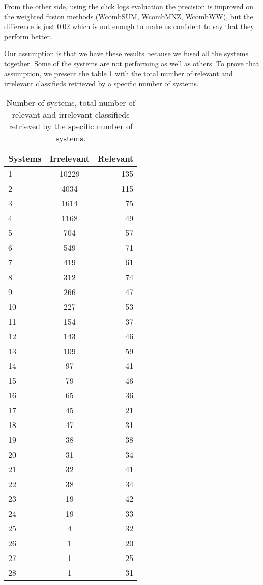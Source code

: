 From the other side, using the click logs evaluation the precision is improved on the weighted fusion methods (WcombSUM, WcombMNZ, WcombWW), but the difference is just 0.02 which is not enough to make us confident to say that they perform better.

Our assumption is that we have these results because we fused all the systems together. Some of the systems are not performing as well as others. To prove that assumption, we present the table \ref{table:relIrelLDF} with the total number of relevant and irrelevant classifieds retrieved by a specific number of systems.


\begin{table}[H]
\begin{center}
\caption{Number of systems, total number of relevant and irrelevant classifieds retrieved by the specific number of systems.}
\label{table:relIrelLDF}
\begin{tabular}{lcr}
\midrule
 Systems & Irrelevant & Relevant \\
 \midrule
1 & 10229 & 135 \\
2 & 4034 & 115 \\
3 & 1614 & 75 \\
4 & 1168 & 49 \\
5 & 704 & 57 \\
6 & 549 & 71 \\
7 & 419 & 61 \\
8 & 312 & 74 \\
9 & 266 & 47 \\
10 & 227 & 53 \\
11 & 154 & 37 \\
12 & 143 & 46 \\
13 & 109 & 59 \\
14 & 97 & 41 \\
15 & 79 & 46 \\
16 & 65 & 36 \\
17 & 45 & 21 \\
18 & 47 & 31 \\
19 & 38 & 38 \\
20 & 31 & 34 \\
21 & 32 & 41 \\
22 & 38 & 34 \\
23 & 19 & 42 \\
24 & 19 & 33 \\
25 & 4 & 32 \\
26 & 1 & 20 \\
27 & 1 & 25 \\
28 & 1 & 31 \\
\bottomrule
\end{tabular}
\end{center}
\end{table}

